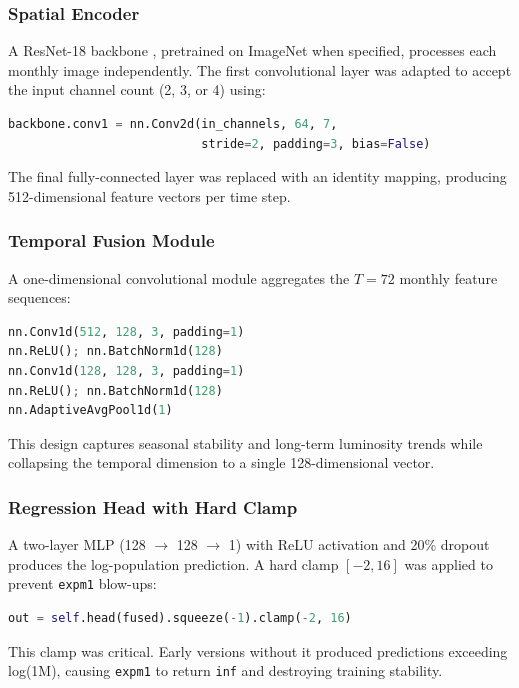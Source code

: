 \documentclass[12pt,a4paper]{article}
\begin{document}
\subsubsection{Spatial Encoder}

A ResNet-18 backbone \citep{he2016resnet}, pretrained on ImageNet when specified, processes each monthly image independently. The first convolutional layer was adapted to accept the input channel count (2, 3, or 4) using:

\begin{lstlisting}[language=Python]
backbone.conv1 = nn.Conv2d(in_channels, 64, 7, 
                           stride=2, padding=3, bias=False)
\end{lstlisting}

The final fully-connected layer was replaced with an identity mapping, producing 512-dimensional feature vectors per time step.

\subsubsection{Temporal Fusion Module}

A one-dimensional convolutional module aggregates the $T = 72$ monthly feature sequences:

\begin{lstlisting}[language=Python]
nn.Conv1d(512, 128, 3, padding=1)
nn.ReLU(); nn.BatchNorm1d(128)
nn.Conv1d(128, 128, 3, padding=1)
nn.ReLU(); nn.BatchNorm1d(128)
nn.AdaptiveAvgPool1d(1)
\end{lstlisting}

This design captures seasonal stability and long-term luminosity trends while collapsing the temporal dimension to a single 128-dimensional vector.

\subsubsection{Regression Head with Hard Clamp}

A two-layer MLP (128 $\rightarrow$ 128 $\rightarrow$ 1) with ReLU activation and 20\% dropout produces the log-population prediction. A hard clamp $[-2, 16]$ was applied to prevent \texttt{expm1} blow-ups:

\begin{lstlisting}[language=Python]
out = self.head(fused).squeeze(-1).clamp(-2, 16)
\end{lstlisting}

This clamp was critical. Early versions without it produced predictions exceeding log(1M), causing \texttt{expm1} to return \texttt{inf} and destroying training stability.
\end{document}

